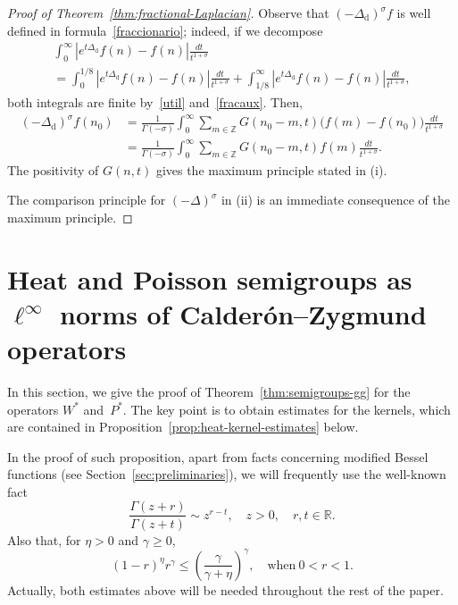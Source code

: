 \documentclass[11pt]{amsart}
\numberwithin{equation}{section}
\newcommand{\Z}{\mathbb{Z}}
\newcommand{\R}{\mathbb{R}}
\newcommand{\dis}{\mathrm{d}}
\theoremstyle{plain}
\theoremstyle{remark}
\begin{document}
\begin{proof}[Proof of Theorem~\ref{thm:fractional-Laplacian}]
Observe that $(-\Delta_{\dis})^\sigma f $ is well defined in formula~\eqref{fraccionario}; indeed,
if we decompose
\begin{multline*}
\int_0^\infty |e^{t\Delta_{\dis}}f(n) -f(n)| \frac{dt}{t^{1+\sigma}} \\
=
\int_0^{1/8} |e^{t\Delta_{\dis}}f(n) -f(n)| \frac{dt}{t^{1+\sigma}}
+
\int_{1/8}^\infty |e^{t\Delta_{\dis}}f(n) -f(n)| \frac{dt}{t^{1+\sigma}},
\end{multline*}
both integrals are finite by~\eqref{util} and~\eqref{fracaux}.
Then,
\begin{align*}
(-\Delta_{\dis})^\sigma f (n_0)
&= \frac1{\Gamma(-\sigma)}
\int_0^\infty \sum_{m\in \Z} G(n_0-m,t)\big(f(m)-f(n_0) \big) \frac{dt}{t^{1+\sigma}} \\
&= \frac1{\Gamma(-\sigma)}
\int_0^\infty \sum_{m\in \Z} G(n_0-m,t) f(m) \frac{dt}{t^{1+\sigma}}.
\end{align*}
The positivity of $G(n,t)$ gives the maximum principle stated in (i).

The comparison principle for $(-\Delta)^\sigma$ in (ii) is an immediate consequence of the maximum principle.
\end{proof}

\section{Heat and Poisson semigroups as $\ell^\infty$ norms of Calder\'on--Zygmund operators}
\label{sec:semigroups}

In this section, we give the proof of Theorem~\ref{thm:semigroups-gg} for the operators $W^*$ and~$P^*$. The key point is to obtain estimates for the kernels, which are contained in Proposition~\ref{prop:heat-kernel-estimates} below.

In the proof of such proposition, apart from facts concerning modified Bessel functions (see Section~\ref{sec:preliminaries}), we will frequently use the well-known fact
\begin{equation}
\label{eq:gambas}
\frac{\Gamma(z+r)}{\Gamma(z+t)}\sim z^{r-t}, \quad z>0, \quad r,t\in \R.
\end{equation}
Also that, for $\eta>0$ and $\gamma\ge0$,
\begin{equation}
\label{functionh}
(1-r)^\eta r^{\gamma}\le \left(\frac{\gamma}{\gamma+\eta}\right)^\gamma,
\quad\text{when}~0<r<1.
\end{equation}
Actually, both estimates above will be needed throughout the rest of the paper.
\end{document}

